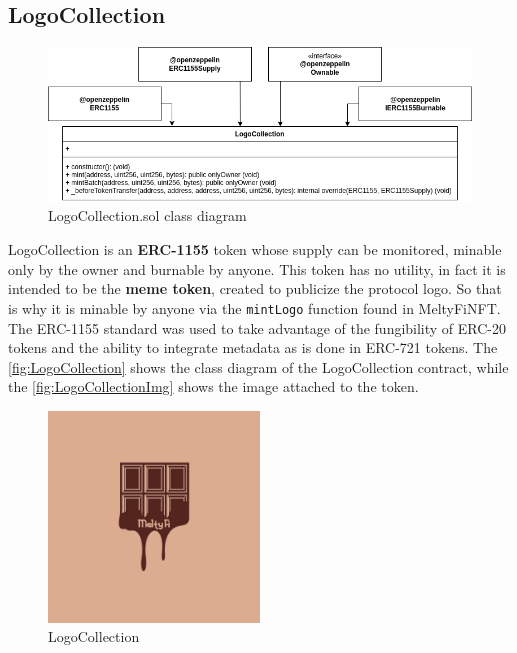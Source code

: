 \subsection{LogoCollection}
\begin{figure}[h]
    \centering
    \includegraphics[width=\textwidth]{figures/LogoCollection_class_diagram.png}
    \caption{LogoCollection.sol class diagram}
    \label{fig:LogoCollection}
\end{figure}
LogoCollection is an \textbf{ERC-1155} token whose supply can be monitored, minable only by the owner and burnable by anyone. This token has no utility, in fact it is intended to be the \textbf{meme token}, created to publicize the protocol logo. So that is why it is minable by anyone via the \texttt{mintLogo} function found in MeltyFiNFT. The ERC-1155 standard was used to take advantage of the fungibility of ERC-20 tokens and the ability to integrate metadata as is done in ERC-721 tokens. The \autoref{fig:LogoCollection} shows the class diagram of the LogoCollection contract, while the \autoref{fig:LogoCollectionImg} shows the image attached to the token. 
\begin{figure}[h]
    \centering
    \includegraphics[width=0.5\textwidth]{figures/LogoCollectionImg.jpg}
    \caption{LogoCollection}
    \label{fig:LogoCollectionImg}
\end{figure}

